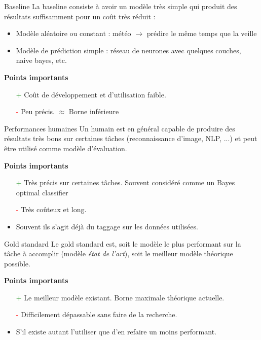 \begin{frame}{Baseline}
La baseline consiste à avoir un modèle très simple qui produit des résultats suffisamment pour un coût très réduit :
\begin{itemize}
  \item Modèle aléatoire ou constant : météo $\rightarrow$ prédire le même temps que la veille
  \item Modèle de prédiction simple : réseau de neurones avec quelques couches, naive bayes, etc.
\end{itemize}

\textbf{Points importants}
\begin{itemize}
  \item[\textcolor{green}{+}] Coût de développement et d'utilisation faible. 
  \item[\textcolor{red}{-}] Peu précis. $\approx$ Borne inférieure
\end{itemize}
\end{frame}

\begin{frame}{Performances humaines}
  Un humain est en général capable de produire des résultats très bons sur certaines tâches (reconnaissance d'image, NLP, ...) et peut être utilisé comme modèle d'évaluation.

\textbf{Points importants}
\begin{itemize}
  \item[\textcolor{green}{+}] Très précis sur certaines tâches. Souvent considéré comme un Bayes optimal classifier 
  \item[\textcolor{red}{-}] Très coûteux et long.
  \item Souvent ils s'agit déjà du taggage sur les données utilisées. 
\end{itemize}
\end{frame}

\begin{frame}{Gold standard}
  Le gold standard est, soit le modèle le plus performant sur la tâche à accomplir (modèle \emph{état de l'art}), soit le meilleur modèle théorique possible.

\textbf{Points importants}
\begin{itemize}
  \item[\textcolor{green}{+}] Le meilleur modèle existant. Borne maximale théorique actuelle.
  \item[\textcolor{red}{-}] Difficilement dépassable sans faire de la recherche.
  \item S'il existe autant l'utiliser que d'en refaire un moins performant.
\end{itemize}
\end{frame}